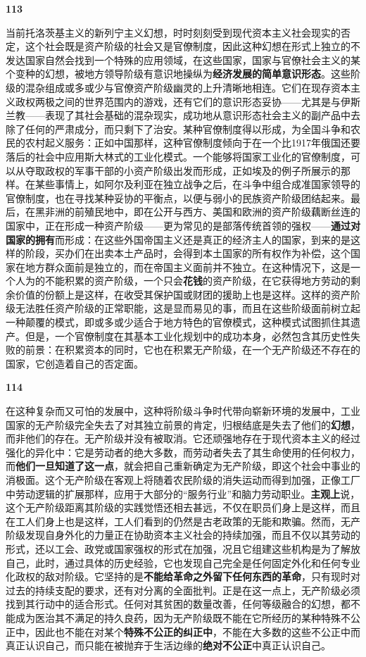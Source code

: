 \documentclass[fontset=fandol, a4paper, 12pt, openright]{ctexbook}
\makeatletter
\newcommand{\thesis}[1]{%
    \par\vspace{1.5em}%
    {\centering \textbf{\Large #1}\par}%
    \nobreak\vspace{0.5em}\nobreak
    \@afterindenttrue %
    \@afterheading    %
}
\makeatother
\begin{document}
\thesis{113}
当前托洛茨基主义的新列宁主义幻想，时时刻刻受到现代资本主义社会现实的否定，这个社会既是资产阶级的社会又是官僚制度，因此这种幻想在形式上独立的不发达国家自然会找到一个特殊的应用领域，在这些国家，国家与官僚社会主义的某个变种的幻想，被地方领导阶级有意识地操纵为\textbf{经济发展的简单意识形态}。这些阶级的混杂组成或多或少与官僚资产阶级幽灵的上升清晰地相连。它们在现存资本主义政权两极之间的世界范围内的游戏，还有它们的意识形态妥协——尤其是与伊斯兰教——表现了其社会基础的混杂现实，成功地从意识形态社会主义的副产品中去除了任何的严肃成分，而只剩下了治安。某种官僚制度得以形成，为全国斗争和农民的农村起义服务：正如中国那样，这种官僚制度倾向于在一个比1917年俄国还要落后的社会中应用斯大林式的工业化模式。一个能够将国家工业化的官僚制度，可以从夺取政权的军事干部的小资产阶级出发而形成，正如埃及的例子所展示的那样。在某些事情上，如阿尔及利亚在独立战争之后，在斗争中组合成准国家领导的官僚制度，也在寻找某种妥协的平衡点，以便与弱小的民族资产阶级团结起来。最后，在黑非洲的前殖民地中，即在公开与西方、美国和欧洲的资产阶级藕断丝连的国家中，正在形成一种资产阶级——更为常见的是部落传统首领的强权——\textbf{通过对国家的拥有}而形成：在这些外国帝国主义还是真正的经济主人的国家，到来的是这样的阶段，买办们在出卖本土产品时，会得到本土国家的所有权作为补偿，这个国家在地方群众面前是独立的，而在帝国主义面前并不独立。在这种情况下，这是一个人为的不能积累的资产阶级，一个只会\textbf{花钱}的资产阶级，在它获得地方劳动的剩余价值的份额上是这样，在收受其保护国或财团的援助上也是这样。这样的资产阶级无法胜任资产阶级的正常职能，这是显而易见的事，而且在这些阶级面前树立起一种颠覆的模式，即或多或少适合于地方特色的官僚模式，这种模式试图抓住其遗产。但是，一个官僚制度在其基本工业化规划中的成功本身，必然包含其历史性失败的前景：在积累资本的同时，它也在积累无产阶级，在一个无产阶级还不存在的国家，它创造着自己的否定面。

\thesis{114}
在这种复杂而又可怕的发展中，这种将阶级斗争时代带向崭新环境的发展中，工业国家的无产阶级完全失去了对其独立前景的肯定，归根结底是失去了他们的\textbf{幻想}，而非他们的存在。无产阶级并没有被取消。它还顽强地存在于现代资本主义的经过强化的异化中：它是劳动者的绝大多数，而劳动者失去了其生命使用的任何权力，而\textbf{他们一旦知道了这一点}，就会把自己重新确定为无产阶级，即这个社会中事业的消极面。这个无产阶级在客观上将随着农民阶级的消失运动而得到加强，正像工厂中劳动逻辑的扩展那样，应用于大部分的“服务行业”和脑力劳动职业。\textbf{主观上}说，这个无产阶级距离其阶级的实践觉悟还相去甚远，不仅在职员们身上是这样，而且在工人们身上也是这样，工人们看到的仍然是古老政策的无能和欺骗。然而，无产阶级发现自身外化的力量正在协助资本主义社会的持续加强，而且不仅以其劳动的形式，还以工会、政党或国家强权的形式在加强，况且它组建这些机构是为了解放自己，此时，通过具体的历史经验，它也发现自己完全是任何固定外化和任何专业化政权的敌对阶级。它坚持的是\textbf{不能给革命之外留下任何东西的革命}，只有现时对过去的持续支配的要求，还有对分离的全面批判。正是在这一点上，无产阶级必须找到其行动中的适合形式。任何对其贫困的数量改善，任何等级融合的幻想，都不能成为医治其不满足的持久良药，因为无产阶级既不能在它所经历的某种特殊不公正中，因此也不能在对某个\textbf{特殊不公正的纠正中}，不能在大多数的这些不公正中而真正认识自己，而只能在被抛弃于生活边缘的\textbf{绝对不公正}中真正认识自己。
\end{document}
